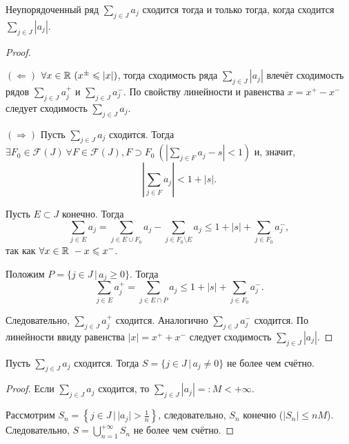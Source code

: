 \begin{theorem}
    Неупорядоченный ряд $\sum_{j \in J} a_j$ сходится тогда и только тогда, когда сходится $\sum_{j \in J} |a_j|$.

    \begin{proof}~
    
        $(\Leftarrow)$ $\forall x \in \mathbb{R} \ (x^{\pm} \leqslant |x|)$, тогда сходимость ряда $\sum_{j \in J} |a_j|$ влечёт сходимость рядов $\sum_{j \in J} a_j^+$ и $\sum_{j \in J} a_j^-$. По свойству линейности и равенства $x = x^+ - x^-$ следует сходимость $\sum_{j \in J} a_j$.

        $(\Rightarrow)$  Пусть $\sum_{j \in J} a_j$ сходится. Тогда $\exists F_0 \in \mathcal{F}(J) \ \forall F \in \mathcal{F}(J), F \supset F_0 \ \left(\left|\sum_{j \in F} a_j - s\right| < 1\right)$ и, значит,
        \[
            \left|\sum_{j \in F} a_j\right| < 1 + |s|.
        \]

        Пусть $E \subset J$ конечно. Тогда
        \[
            \sum_{j \in E} a_j = \sum_{j \in E \cup F_0} a_j - \sum_{j \in F_0 \setminus E} a_j \le 1 + |s| + \sum_{j \in F_0} a_j^-,
        \]
        так как $\forall x \in \mathbb{R} \ -x \leqslant x^-$.

        Положим $P = \{j \in J \,|\, a_j \ge 0\}$. Тогда
        \[
            \sum_{j \in E} a_j^+ = \sum_{j \in E \cap P} a_j \le 1 + |s| + \sum_{j \in F_0} a_j^-.
        \]

        Следовательно, $\sum_{j \in J} a_j^+$ сходится. Аналогично $\sum_{j \in J} a_j^-$ сходится. По линейности ввиду равенства $|x| = x^+ + x^-$ следует сходимость $\sum_{j \in J} |a_j|$.
    \end{proof}
\end{theorem}

\begin{corollary}
    Пусть $\sum_{j \in J} a_j$ сходится. Тогда $S = \{j \in J \,|\, a_j \neq 0\}$ не более чем счётно.

    \begin{proof}
        Если $\sum_{j \in J} a_j$ сходится, то $\sum_{j \in J} |a_j| =: M < {+\infty}$.

        Рассмотрим $S_n = \left\{j \in J \,|\, |a_j| > \frac{1}{n}\right\}$, следовательно, $S_n$ конечно ($|S_n| \le nM$). Следовательно, $S = \bigcup_{n = 1}^{+\infty} S_n$ не более чем счётно.
    \end{proof}
\end{corollary}